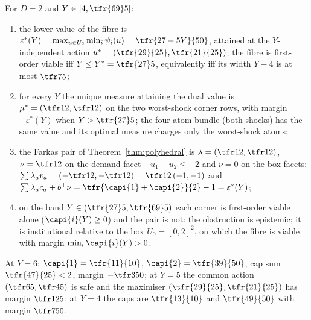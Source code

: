 \begin{proposition}\label{prop:benchmark}
For $D=2$ and $Y\in[4,\tfr{69}5]$:
\begin{enumerate}[leftmargin=1.6em,itemsep=1pt]
\item[(i)] the lower value of the fibre is $\varepsilon^\ast(Y)=\max_{u\in U_2}\min_i\psi_i(u)=\tfr{27-5Y}{50}$, attained at the $Y$-independent action $u^\ast=(\tfr{29}{25},\tfr{21}{25})$; the fibre is first-order viable iff $Y\le Y^\ast=\tfr{27}5$, equivalently iff its width $Y-4$ is at most $\tfr75$;
\item[(ii)] for every $Y$ the unique measure attaining the dual value is $\mu^\ast=(\tfr12,\tfr12)$ on the two worst-shock corner rows, with margin $-\varepsilon^\ast(Y)$ when $Y>\tfr{27}5$; the four-atom bundle (both shocks) has the same value and its optimal measure charges only the worst-shock atoms;
\item[(iii)] the Farkas pair of Theorem~\ref{thm:polyhedral} is $\lambda=(\tfr12,\tfr12)$, $\nu=\tfr12$ on the demand facet $-u_1-u_2\le-2$ and $\nu=0$ on the box facets: $\sum\lambda_av_a=(-\tfr12,-\tfr12)=\tfr12\,(-1,-1)$ and $\sum\lambda_ac_a+b^\top\nu=\tfr{\capi{1}+\capi{2}}{2}-1=\varepsilon^\ast(Y)$;
\item[(iv)] on the band $Y\in(\tfr{27}5,\tfr{69}5)$ each corner is first-order viable alone ($\capi{i}(Y)\ge0$) and the pair is not: the obstruction is epistemic; it is institutional relative to the box $U_0=[0,2]^2$, on which the fibre is viable with margin $\min_i\capi{i}(Y)>0$.
\end{enumerate}
At $Y=6$: $\capi{1}=\tfr{11}{10}$, $\capi{2}=\tfr{39}{50}$, cap sum $\tfr{47}{25}<2$, margin $-\tfr3{50}$; at $Y=5$ the common action $(\tfr65,\tfr45)$ is safe and the maximiser $(\tfr{29}{25},\tfr{21}{25})$ has margin $\tfr1{25}$; at $Y=4$ the caps are $\tfr{13}{10}$ and $\tfr{49}{50}$ with margin $\tfr7{50}$.
\end{proposition}

